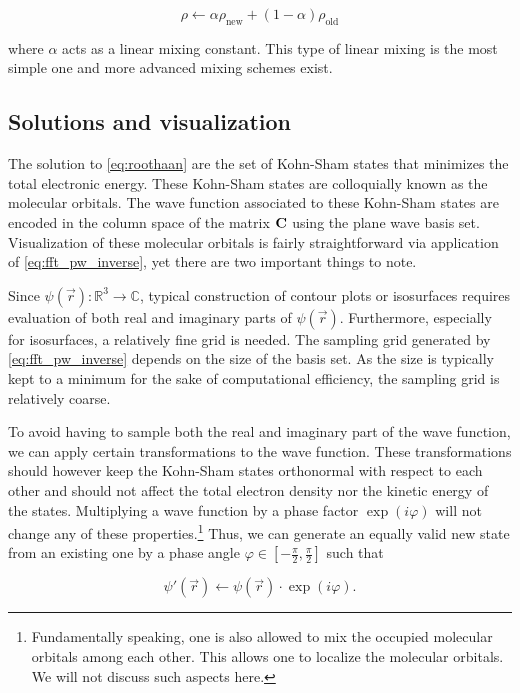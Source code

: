 \begin{equation}
    \rho \leftarrow \alpha \rho_{\text{new}} + (1 - \alpha) \rho_{\text{old}}
\end{equation}

where $\alpha$ acts as a linear mixing constant. This type of linear mixing is the most simple one and more advanced mixing schemes exist.

%
%
%
\subsection{Solutions and visualization}

The solution to \cref{eq:roothaan} are the set of Kohn-Sham states that minimizes the total electronic energy. These Kohn-Sham states are colloquially known as the molecular orbitals. The wave function associated to these Kohn-Sham states are encoded in the column space of the matrix $\mathbf{C}$ using the plane wave basis set. Visualization of these molecular orbitals is fairly straightforward via application of \cref{eq:fft_pw_inverse}, yet there are two important things to note.

Since $\psi(\vec{r}): \mathbb{R}^{3} \rightarrow \mathbb{C}$, typical construction of contour plots or isosurfaces requires evaluation of both real and imaginary parts of $\psi(\vec{r})$. Furthermore, especially for isosurfaces, a relatively fine grid is needed. The sampling grid generated by \cref{eq:fft_pw_inverse} depends on the size of the basis set. As the size is typically kept to a minimum for the sake of computational efficiency, the sampling grid is relatively coarse.

To avoid having to sample both the real and imaginary part of the wave function, we can apply certain transformations to the wave function. These transformations should however keep the Kohn-Sham states orthonormal with respect to each other and should not affect the total electron density nor the kinetic energy of the states. Multiplying a wave function by a phase factor $\exp(i\varphi)$ will not change any of these properties.\footnote{Fundamentally speaking, one is also allowed to mix the occupied molecular orbitals among each other. This allows one to localize the molecular orbitals. We will not discuss such aspects here.} Thus, we can generate an equally valid new state from an existing one by a phase angle $\varphi \in \left[-\frac{\pi}{2},\frac{\pi}{2}\right]$ such that

\begin{equation}
    \psi\prime(\vec{r}) \leftarrow \psi(\vec{r}) \cdot \exp \left(i \varphi \right).
    \label{eq:psi_transform}
\end{equation}

